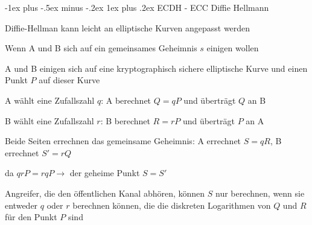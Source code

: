 \documentclass[a4paper]{article}
\makeatletter
\renewcommand{\subsubsection}{\@startsection{subsubsection}{3}{0mm}%
 {-1ex plus -.5ex minus -.2ex}%
 {1ex plus .2ex}%
 {\normalfont\small\bfseries}}
\makeatother
\begin{document}
\begin{multicols}{3}
      \subsubsection{ECDH - ECC Diffie Hellmann}
      \begin{itemize*}
            \item Diffie-Hellman kann leicht an elliptische Kurven angepasst werden
            \item Wenn A und B sich auf ein gemeinsames Geheimnis $s$ einigen wollen
            \begin{itemize*}
                  \item A und B einigen sich auf eine kryptographisch sichere elliptische Kurve und einen Punkt $P$ auf dieser Kurve
                  \item A wählt eine Zufallszahl $q$: A berechnet $Q=qP$ und überträgt $Q$ an B
                  \item B wählt eine Zufallszahl $r$: B berechnet $R=rP$ und überträgt $P$ an A
                  \item Beide Seiten errechnen das gemeinsame Geheimnis: A errechnet $S=qR$, B errechnet $S'=rQ$
                  \item da $qrP=rqP \rightarrow$ der geheime Punkt $S=S'$
            \end{itemize*}
            \item Angreifer, die den öffentlichen Kanal abhören, können $S$ nur berechnen, wenn sie entweder $q$ oder $r$ berechnen können, die die diskreten Logarithmen von $Q$ und $R$ für den Punkt $P$ sind
      \end{itemize*}


\end{multicols}
\end{document}
